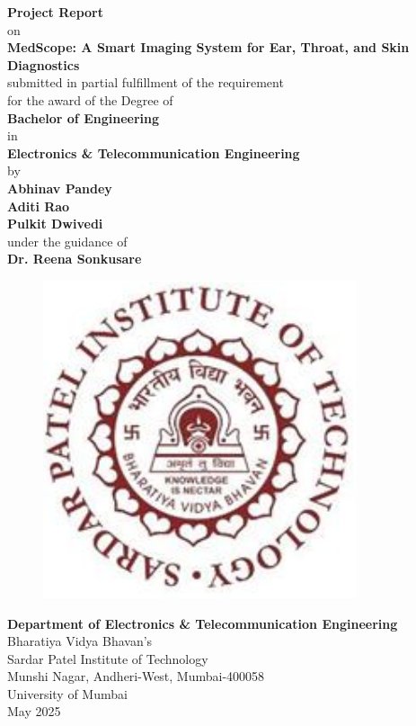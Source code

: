 \begin{titlepage}
\vspace*{0.25cm}
{\centering
\large
{\textbf {Project Report}} \\
on\\
{\Large\textbf {MedScope: A Smart Imaging System for Ear, Throat, and Skin Diagnostics}}\\
\vspace{0.75cm}
submitted in partial fulfillment of the requirement\\
for the award of the Degree of\\\vspace{1cm}
{\large\textbf {Bachelor of Engineering}}\\
in \\
{\large\textbf {Electronics \& Telecommunication Engineering}}\\
\vspace{0.75cm}
by\\
\vspace{0.75cm}
{\large \textbf {Abhinav Pandey}}\\
{\large \textbf {Aditi Rao}}\\
{\large \textbf {Pulkit Dwivedi}}\\
\vspace{0.75cm} 
under the guidance of\\ 
\vspace{0.75cm}
\hspace{.03cm} {\large \textbf {Dr. Reena Sonkusare}}\\
\begin{figure}[h]
\centering
\includegraphics[scale=0.8]{spitlogo.pdf}
\end{figure}
\hspace{.05cm}
\hspace{.05cm}
\textbf {Department of Electronics \& Telecommunication Engineering}\\
Bharatiya  Vidya Bhavan's\\
Sardar Patel Institute of Technology\\
Munshi Nagar, Andheri-West, Mumbai-400058\\
University of Mumbai\\
\hspace{7.25cm}May 2025}\\
\end{titlepage}
\newpage

